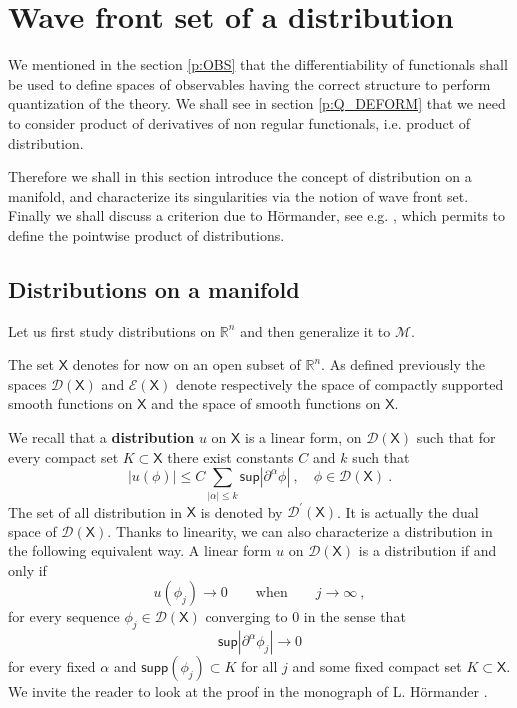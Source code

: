 \documentclass[11pt]{book}
\newcommand{\supp}{\mathsf{supp}}
\renewcommand{\sup}{\mathsf{sup}}
\newcommand{\abs}[1]{\left|#1\right|}
\newcommand{\Dcal}{\mathcal{D}}
\newcommand{\Ecal}{\mathcal{E}}
\newcommand{\Mcal}{\mathcal{M}}
\newcommand{\Rbb}{\mathbb{R}}
\newcommand{\Xsf}{\mathsf{X}}
\theoremstyle{break}
\begin{document}
\section{Wave front set of a distribution}


We mentioned in the section \ref{p:OBS} that the differentiability of functionals shall be used to define spaces of observables having the correct structure to perform quantization of the theory. We shall see in section \ref{p:Q_DEFORM} that we need to consider product of derivatives of non regular functionals, i.e. product of distribution. 


Therefore we shall in this section introduce the concept of distribution on a manifold, and characterize its singularities via the notion of wave front set. Finally we shall discuss a criterion due to Hörmander, see e.g. \cite{hormander_analysis_1990}, which permits to define the pointwise product of distributions.


\subsection{Distributions on a manifold}\label{p:DISTRIB}


Let us first study distributions on $\Rbb^n$ and then generalize it to $\Mcal$. 


The set $\Xsf$ denotes for now on an open subset of $\Rbb^n$. As defined previously the spaces $\Dcal(\Xsf)$ and $\Ecal(\Xsf)$ denote respectively the space of compactly supported smooth functions on $\Xsf$ and the space of smooth functions on $\Xsf$.


We recall that a \textbf{distribution} $u$ on $\Xsf$ is a linear form, on $\Dcal(\Xsf)$ such that for every compact set $K \subset \Xsf$ there exist constants $C$ and $k$ such that
%
\begin{equation*}
\abs{u(\phi)} \leq C \sum_{\abs{\alpha} \leq k} \sup \abs{\partial^\alpha \phi} \ , \quad \phi \in \Dcal(\Xsf) \ .
\end{equation*}
%
The set of all distribution in $\Xsf$ is denoted by $\Dcal^\prime(\Xsf)$. It is actually the dual space of $\Dcal(\Xsf)$. Thanks to linearity, we can also characterize a distribution in the following equivalent way. A linear form $u$ on $\Dcal(\Xsf)$ is a distribution if and only if 
%
\begin{equation*}
u(\phi_j) \to 0 \qquad  \mbox{when} \qquad j \to \infty \ ,
\end{equation*}
%
for every sequence $\phi_j \in \Dcal(\Xsf)$ converging to $0$ in the sense that
%
\begin{equation*}
\sup\abs{\partial^\alpha\phi_j} \to 0
\end{equation*}
%
for every fixed $\alpha$ and $\supp(\phi_j) \subset K$ for all $j$ and some fixed compact set $K \subset \Xsf$. We invite the reader to look at the proof in the monograph of L. Hörmander \cite{hormander_analysis_1990}.
\end{document}
